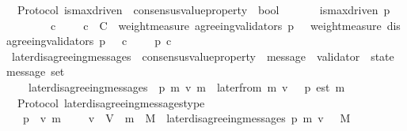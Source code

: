 \begin{isabellebody}
\isanewline
\isanewline
{}\isamarkupfalse%
\ {\isacharparenleft}\ Protocol{\isacharparenright}\ is{\isacharunderscore}max{\isacharunderscore}driven\ {\isacharcolon}{\isacharcolon}\ {\isachardoublequoteopen}consensus{\isacharunderscore}value{\isacharunderscore}property\ {\isasymRightarrow}\ bool{\isachardoublequoteclose}\isanewline
\ \ \isanewline
\ \ \ \ {\isachardoublequoteopen}is{\isacharunderscore}max{\isacharunderscore}driven\ p\ {\isacharequal}\isanewline
\ \ \ \ \ \ {\isacharparenleft}{\isasymforall}\ {\isasymsigma}\ c{\isachardot}\ {\isasymsigma}\ {\isasymin}\ {\isasymSigma}\ {\isasymand}\ c\ {\isasymin}\ C\ {\isasymand}\ weight{\isacharunderscore}measure\ {\isacharparenleft}agreeing{\isacharunderscore}validators\ {\isacharparenleft}p{\isacharcomma}\ {\isasymsigma}{\isacharparenright}{\isacharparenright}\ {\isachargreater}\ weight{\isacharunderscore}measure\ {\isacharparenleft}disagreeing{\isacharunderscore}validators\ {\isacharparenleft}p{\isacharcomma}\ {\isasymsigma}{\isacharparenright}{\isacharparenright}\ {\isasymlongrightarrow}\ c\ {\isasymin}\ {\isasymepsilon}\ {\isasymsigma}\ {\isasymand}\ p\ c{\isacharparenright}{\isachardoublequoteclose}\isanewline
\isanewline
\isanewline
{}\isamarkupfalse%
\ later{\isacharunderscore}disagreeing{\isacharunderscore}messages\ {\isacharcolon}{\isacharcolon}\ {\isachardoublequoteopen}{\isacharparenleft}consensus{\isacharunderscore}value{\isacharunderscore}property\ {\isacharasterisk}\ message\ {\isacharasterisk}\ validator\ {\isacharasterisk}\ state{\isacharparenright}\ {\isasymRightarrow}\ message\ set{\isachardoublequoteclose}\isanewline
\ \ \ \isanewline
\ \ \ \ {\isachardoublequoteopen}later{\isacharunderscore}disagreeing{\isacharunderscore}messages\ {\isacharequal}\ {\isacharparenleft}{\isasymlambda}{\isacharparenleft}p{\isacharcomma}\ m{\isacharcomma}\ v{\isacharcomma}\ {\isasymsigma}{\isacharparenright}{\isachardot}{\isacharbraceleft}m{\isacharprime}\ {\isasymin}\ later{\isacharunderscore}from\ {\isacharparenleft}m{\isacharcomma}\ v{\isacharcomma}\ {\isasymsigma}{\isacharparenright}{\isachardot}\ {\isasymnot}\ p\ {\isacharparenleft}est\ m{\isacharprime}{\isacharparenright}{\isacharbraceright}{\isacharparenright}{\isachardoublequoteclose}\isanewline
\isanewline
{}\isamarkupfalse%
\ {\isacharparenleft}\ Protocol{\isacharparenright}\ later{\isacharunderscore}disagreeing{\isacharunderscore}messages{\isacharunderscore}type\ {\isacharcolon}\isanewline
\ \ {\isachardoublequoteopen}{\isasymforall}\ p\ {\isasymsigma}\ v\ m{\isachardot}\ {\isasymsigma}\ {\isasymin}\ {\isasymSigma}\ {\isasymand}\ v\ {\isasymin}\ V\ {\isasymand}\ m\ {\isasymin}\ M\ {\isasymlongrightarrow}\ later{\isacharunderscore}disagreeing{\isacharunderscore}messages\ {\isacharparenleft}p{\isacharcomma}\ m{\isacharcomma}\ v{\isacharcomma}\ {\isasymsigma}{\isacharparenright}\ {\isasymsubseteq}\ M{\isachardoublequoteclose}\isanewline

\end{isabellebody}
